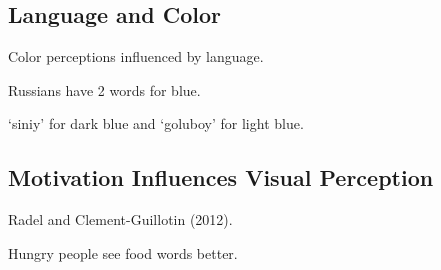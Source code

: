 \subsection{Language and Color}

\begin{coloredlist}
    \item Color perceptions influenced by language.
    \item Russians have 2 words for blue.
    \begin{coloredlist}
        \item `siniy' for dark blue and `goluboy' for light blue.
    \end{coloredlist}
\end{coloredlist}

\subsection{Motivation Influences Visual Perception}

\begin{coloredlist}
    \item Radel and Clement-Guillotin (2012).
    \begin{coloredlist}
        \item Hungry people see food words better.
    \end{coloredlist}
\end{coloredlist}






